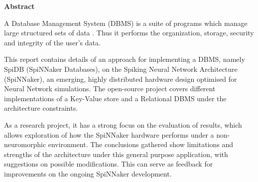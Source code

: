 \vspace*{1.5cm}
{ \huge \bfseries Abstract}
\vspace{7mm}

A Database Management System (DBMS) is a suite of programs which manage large structured sets of data \cite{dbmsdef}. Thus it performs the organization, storage, security and integrity of the user's data.

This report contains details of an approach for implementing a DBMS, namely SpiDB (SpiNNaker Databases), on the Spiking Neural Network Architecture (SpiNNaker), an emerging, highly distributed hardware design optimised for Neural Network simulations. The open-source project covers different implementations of a Key-Value store and a Relational DBMS under the architecture constraints.

As a research project, it has a strong focus on the evaluation of results, which allows exploration of how the SpiNNaker hardware performs under a non-neuromorphic environment. The conclusions gathered show limitations and strengths of the architecture under this general purpose application, with suggestions on possible modifications. This can serve as feedback for improvements on the ongoing SpiNNaker development.
